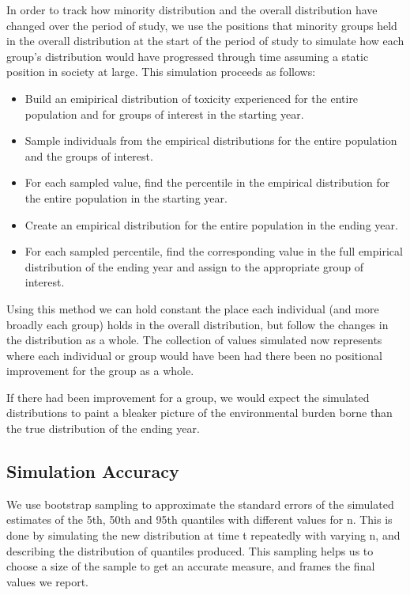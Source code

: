 \documentclass[12pt,twoside]{dukestatscithesis}
\theoremstyle{definition}
\theoremstyle{definition}
\theoremstyle{definition}
\theoremstyle{remark}
\begin{document}
In order to track how minority distribution and the overall distribution
have changed over the period of study, we use the positions that
minority groups held in the overall distribution at the start of the
period of study to simulate how each group's distribution would have
progressed through time assuming a static position in society at large.
This simulation proceeds as follows:
\begin{itemize}
\item
  Build an emipirical distribution of toxicity experienced for the
  entire population and for groups of interest in the starting year.
\item
  Sample individuals from the empirical distributions for the entire
  population and the groups of interest.
\item
  For each sampled value, find the percentile in the empirical
  distribution for the entire population in the starting year.
\item
  Create an empirical distribution for the entire population in the
  ending year.
\item
  For each sampled percentile, find the corresponding value in the full
  empirical distribution of the ending year and assign to the
  appropriate group of interest.
\end{itemize}
Using this method we can hold constant the place each individual (and
more broadly each group) holds in the overall distribution, but follow
the changes in the distribution as a whole. The collection of values
simulated now represents where each individual or group would have been
had there been no positional improvement for the group as a whole.

If there had been improvement for a group, we would expect the simulated
distributions to paint a bleaker picture of the environmental burden
borne than the true distribution of the ending year.

\subsection{Simulation Accuracy}\label{simulation-accuracy}

We use bootstrap sampling to approximate the standard errors of the
simulated estimates of the 5th, 50th and 95th quantiles with different
values for n. This is done by simulating the new distribution at time t
repeatedly with varying n, and describing the distribution of quantiles
produced. This sampling helps us to choose a size of the sample to get
an accurate measure, and frames the final values we report.
\end{document}
